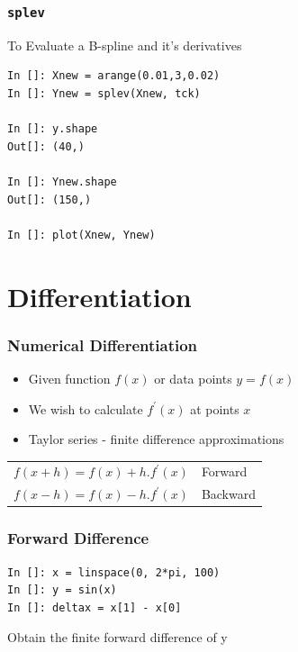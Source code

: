 \documentclass[14pt,compress]{beamer}
\newcommand{\typ}[1]{\lstinline{#1}}
\begin{document}
\begin{frame}[fragile]
\frametitle{\typ{splev}}
To Evaluate a B-spline and it's derivatives
\begin{lstlisting}
In []: Xnew = arange(0.01,3,0.02)
In []: Ynew = splev(Xnew, tck)

In []: y.shape
Out[]: (40,)

In []: Ynew.shape
Out[]: (150,)
 
In []: plot(Xnew, Ynew)
\end{lstlisting}

\end{frame}


\section{Differentiation}

\begin{frame}[fragile]
\frametitle{Numerical Differentiation}
\begin{itemize}
\item Given function $f(x)$ or data points $y=f(x)$
\item We wish to calculate $f^{'}(x)$ at points $x$
\item Taylor series - finite difference approximations
\end{itemize}
\begin{center}
\begin{tabular}{l l}
$f(x+h)=f(x)+h.f^{'}(x)$ &Forward \\
$f(x-h)=f(x)-h.f^{'}(x)$ &Backward
\end{tabular}
\end{center}
\end{frame}

\begin{frame}[fragile]
\frametitle{Forward Difference}
\begin{lstlisting}
In []: x = linspace(0, 2*pi, 100)
In []: y = sin(x)
In []: deltax = x[1] - x[0]
\end{lstlisting}
Obtain the finite forward difference of y
\end{frame}
\end{document}
